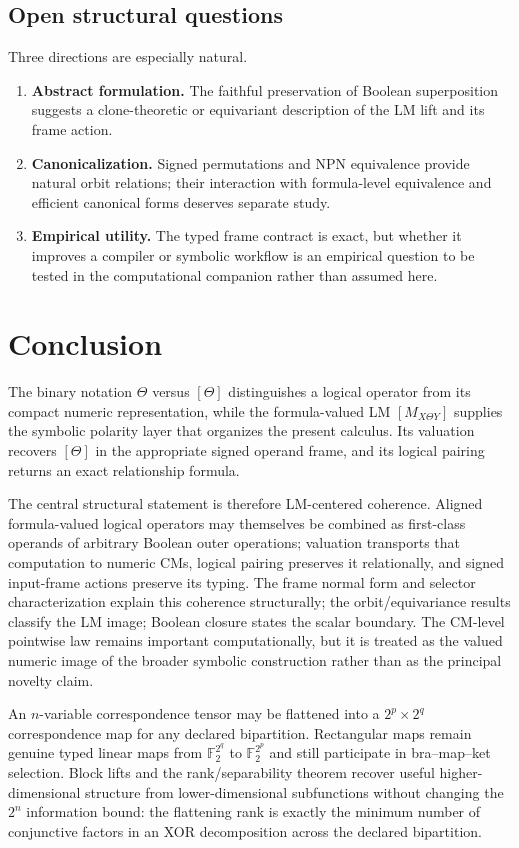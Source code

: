 \documentclass[11pt]{article}
\theoremstyle{definition}
\theoremstyle{remark}
\newcommand{\F}{\mathbb F}
\begin{document}
\subsection{Open structural questions}

Three directions are especially natural.
\begin{enumerate}
  \item \textbf{Abstract formulation.}  The faithful preservation of Boolean superposition suggests a clone-theoretic or equivariant description of the LM lift and its frame action.
  \item \textbf{Canonicalization.}  Signed permutations and NPN equivalence provide natural orbit relations; their interaction with formula-level equivalence and efficient canonical forms deserves separate study.
  \item \textbf{Empirical utility.}  The typed frame contract is exact, but whether it improves a compiler or symbolic workflow is an empirical question to be tested in the computational companion rather than assumed here.
\end{enumerate}

\section{Conclusion}

The binary notation $\Theta$ versus $[\Theta]$ distinguishes a logical operator from its compact numeric representation, while the formula-valued LM $[M_{X\Theta Y}]$ supplies the symbolic polarity layer that organizes the present calculus.  Its valuation recovers $[\Theta]$ in the appropriate signed operand frame, and its logical pairing returns an exact relationship formula.

The central structural statement is therefore LM-centered coherence.  Aligned formula-valued logical operators may themselves be combined as first-class operands of arbitrary Boolean outer operations; valuation transports that computation to numeric CMs, logical pairing preserves it relationally, and signed input-frame actions preserve its typing.  The frame normal form and selector characterization explain this coherence structurally; the orbit/equivariance results classify the LM image; Boolean closure states the scalar boundary.  The CM-level pointwise law remains important computationally, but it is treated as the valued numeric image of the broader symbolic construction rather than as the principal novelty claim.

An $n$-variable correspondence tensor may be flattened into a $2^p\times2^q$ correspondence map for any declared bipartition.  Rectangular maps remain genuine typed linear maps from $\F_2^{2^q}$ to $\F_2^{2^p}$ and still participate in bra--map--ket selection.  Block lifts and the rank/separability theorem recover useful higher-dimensional structure from lower-dimensional subfunctions without changing the $2^n$ information bound: the flattening rank is exactly the minimum number of conjunctive factors in an XOR decomposition across the declared bipartition.
\end{document}
